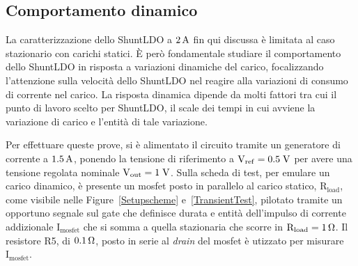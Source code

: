\subsection{Comportamento dinamico}

La caratterizzazione dello ShuntLDO a $2 \rm \, A$ fin qui discussa \`e limitata al caso stazionario con carichi statici.
\`E per\`o fondamentale studiare il comportamento dello ShuntLDO in risposta a variazioni dinamiche del carico, focalizzando l'attenzione sulla velocità dello ShuntLDO nel reagire alla variazioni di consumo di corrente nel carico. 
La risposta dinamica dipende da molti fattori tra cui il punto di lavoro scelto per ShuntLDO, il scale dei tempi in cui avviene la variazione di carico e l'entità di tale variazione.

Per effettuare queste prove, si è alimentato il circuito tramite un generatore di corrente a $1.5\rm \, A$, ponendo la tensione di riferimento a $\mathrm{V_{ref}=0.5 \rm \; V}$ per avere una tensione regolata nominale $\mathrm{V_{out}}=1\rm \; V$. %
Sulla scheda di test, per emulare un carico dinamico, è presente un mosfet posto in parallelo al carico statico, $\mathrm{R_{load}}$, come visibile nelle Figure~\ref{Setupscheme} e~\ref{TransientTest}, pilotato tramite un opportuno segnale sul gate che definisce durata e entit\`a dell'impulso di corrente addizionale $\mathrm{I_{mosfet}}$ che si somma a quella stazionaria che scorre in $\mathrm{R_{load}= 1 {\rm \, \Omega}}$. Il resistore R5, di $0.1 {\rm \, \Omega}$, posto in serie al \textit{drain} del mosfet \`e utizzato per misurare $\mathrm{I_{mosfet}}$.


